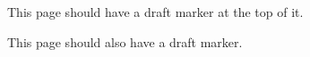 \documentclass{article}
\begin{document}
This page should have a draft marker at the top of it.

\pagebreak

This page should also have a draft marker.
\end{document}
